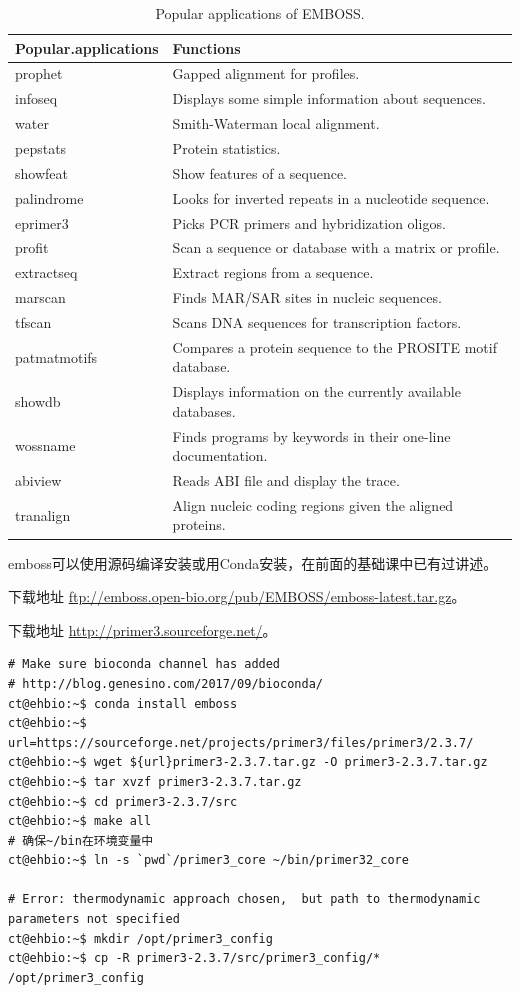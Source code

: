 \documentclass[]{article}
\numberwithin{figure}{section}
\numberwithin{table}{section}
\begin{document}
\begin{table}

\caption{\label{tab:unnamed-chunk-76}Popular applications of EMBOSS.}
\centering
\begin{tabular}[t]{ll}
\toprule
Popular.applications & Functions\\
\midrule
prophet & Gapped alignment for profiles.\\
infoseq & Displays some simple information about sequences.\\
water & Smith-Waterman local alignment.\\
pepstats & Protein statistics.\\
showfeat & Show features of a sequence.\\
\addlinespace
palindrome & Looks for inverted repeats in a nucleotide sequence.\\
eprimer3 & Picks PCR primers and hybridization oligos.\\
profit & Scan a sequence or database with a matrix or profile.\\
extractseq & Extract regions from a sequence.\\
marscan & Finds MAR/SAR sites in nucleic sequences.\\
\addlinespace
tfscan & Scans DNA sequences for transcription factors.\\
patmatmotifs & Compares a protein sequence to the PROSITE motif database.\\
showdb & Displays information on the currently available databases.\\
wossname & Finds programs by keywords in their one-line documentation.\\
abiview & Reads ABI file and display the trace.\\
\addlinespace
tranalign & Align nucleic coding regions given the aligned proteins.\\
\bottomrule
\end{tabular}
\end{table}

emboss可以使用源码编译安装或用Conda安装，在前面的基础课中已有过讲述。

下载地址 \url{ftp://emboss.open-bio.org/pub/EMBOSS/emboss-latest.tar.gz}。

下载地址 \url{http://primer3.sourceforge.net/}。

\begin{verbatim}
# Make sure bioconda channel has added
# http://blog.genesino.com/2017/09/bioconda/
ct@ehbio:~$ conda install emboss
ct@ehbio:~$ url=https://sourceforge.net/projects/primer3/files/primer3/2.3.7/
ct@ehbio:~$ wget ${url}primer3-2.3.7.tar.gz -O primer3-2.3.7.tar.gz
ct@ehbio:~$ tar xvzf primer3-2.3.7.tar.gz
ct@ehbio:~$ cd primer3-2.3.7/src
ct@ehbio:~$ make all
# 确保~/bin在环境变量中
ct@ehbio:~$ ln -s `pwd`/primer3_core ~/bin/primer32_core

# Error: thermodynamic approach chosen,  but path to thermodynamic parameters not specified
ct@ehbio:~$ mkdir /opt/primer3_config
ct@ehbio:~$ cp -R primer3-2.3.7/src/primer3_config/* /opt/primer3_config
\end{verbatim}
\end{document}
